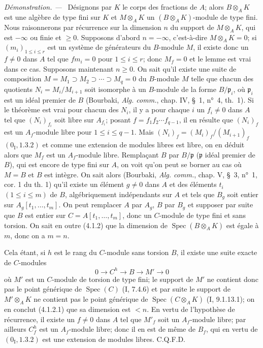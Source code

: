 \documentclass[10pt,oneside]{book}
\newcommand{\oldpage}[2][]{%
  \setcounter{footnote}{0}%
  \marginpar{\scriptsize\textbf{#1}~|~#2}\ignorespaces}
\newenvironment{proof}{%
  \par\medskip\noindent\textit{Démonstration. ---\ }}{\par}
\begin{document}
\begin{proof}
\oldpage[IV-2]{154}
Désignons par $K$ le corps des fractions de $A$; alors $B\otimes_AK$ est une
algèbre de type fini sur $K$ et $M\otimes_AK$ un $(B\otimes_AK)$-module de
type fini. Nous raisonnerons par récurrence sur la dimension $n$ du support de
$M\otimes_AK$, qui est $-\infty$ ou finie et $\geq0$. Supposons d'abord
$n=-\infty$, c'est-à-dire $M\otimes_AK=0$; si $(m_i)_{1\leq i\leq r}$ est
un système de générateurs du $B$-module $M$, il existe donc un $f\ne0$ dans
$A$ tel que $fm_i=0$ pour $1\leq i\leq r$; donc $M_f=0$ et le lemme est vrai
dans ce cas. Supposons maintenant $n\geq0$. On sait qu'il existe une suite de
composition $M=M_1\supset M_2\supset\cdots\supset M_q=0$ du $B$-module $M$
telle que chacun des quotients $N_i=M_i/M_{i+1}$ soit isomorphe à un
$B$-module de la forme $B/\mathfrak p_i$, où $\mathfrak p_i$ est un idéal
premier de $B$ (Bourbaki, \emph{Alg. comm.}, chap. IV, \S~1, n°~4, th.~1).
Si le théorème est vrai pour chacun des $N_i$, il y a pour chaque $i$ un
$f_i\ne0$ dans $A$ tel que $(N_i)_{f_i}$ soit libre sur $A_{f_i}$; posant
$f=f_1f_2\cdots f_{q-1}$, il en résulte que $(N_i)_f$ est un $A_f$-module
libre pour $1\leq i\leq q-1$. Mais $(N_i)_f=(M_i)_f/(M_{i+1})_f$
$(0_{\mathrm I},1.3.2)$ et comme une extension de modules libres est libre, on
en déduit alors que $M_f$ est un $A_f$-module libre. Remplaçant $B$ par
$B/\mathfrak p$ ($\mathfrak p$ idéal premier de $B$), qui est encore de type
fini sur $A$, on voit qu'on peut se borner au cas où $M=B$ et $B$ est intègre.
On sait alors (Bourbaki, \emph{Alg. comm.}, chap. V, \S~3, n°~1, cor. 1 du
th. 1) qu'il existe un élément $g\ne0$ dans $A$ et des éléments $t_i$
$(1\leq i\leq m)$ de $B$, algébriquement indépendants sur $A$ et tels que
$B_g$ soit entier sur $A_g[t_1,\ldots,t_m]$. On peut remplacer $A$ par $A_g$,
$B$ par $B_g$ et supposer par suite que $B$ est entier sur
$C=A[t_1,\ldots,t_m]$, donc un $C$-module de type fini et sans torsion. On sait
en outre (4.1.2) que la dimension de $\operatorname{Spec}(B\otimes_AK)$ est
égale à $m$, donc on a $m=n$.

Cela étant, si $h$ est le rang du $C$-module sans torsion $B$, il existe une
suite exacte de $C$-modules
\[
0\longrightarrow C^h\longrightarrow B\longrightarrow M'\longrightarrow0
\]
où $M'$ est un $C$-module de torsion de type fini; le support de $M'$ ne
contient donc pas le point générique de $\operatorname{Spec}(C)$ (I, 7.4.6)
et par suite le support de $M'\otimes_AK$ ne contient pas le point générique
de $\operatorname{Spec}(C\otimes_AK)$ (I, 9.1.13.1); on en conclut (4.1.2.1)
que sa dimension est $<n$. En vertu de l'hypothèse de récurrence, il existe un
$f\ne0$ dans $A$ tel que $M'_f$ soit un $A_f$-module libre; par ailleurs
$C_f^h$ est un $A_f$-module libre; donc il en est de même de $B_f$, qui en
vertu de $(0_{\mathrm I},1.3.2)$ est une extension de modules libres. C.Q.F.D.
\end{proof}
\end{document}
